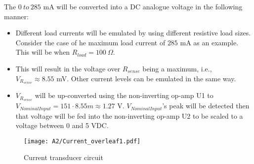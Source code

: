 The $0 \ to \ 285$ mA will be converted into a DC analogue voltage in the following manner:
\begin{itemize}
    \item Different load currents will be emulated by using different resistive load sizes. Consider the case of he maximum load current of $285$ mA as an example. This  will be when $R_{load}=100 \ \Omega$.
    \item This will result in the voltage over $R_{sense}$ being a maximum, i.e., \\$V_{R_{sense}} \approx 8.55$ mV. Other current levels can be emulated in the same way.
    \item $V_{R_{sense}}$ will be up-converted using the non-inverting op-amp U1 to \\$V_{Nominal Input}=151\cdot8.55m\approx 1.27$ V. $V_{Nominal Input}$'s peak will be detected then that voltage will be fed into the non-inverting op-amp U2 to be scaled to a voltage between 0 and 5 VDC.
\end{itemize}

\begin{figure}[H]
    \centering
    \texttt{[image: A2/Current\_overleaf1.pdf]}
    \caption{Current transducer circuit}
    \label{fig:current_diag}
\end{figure}



